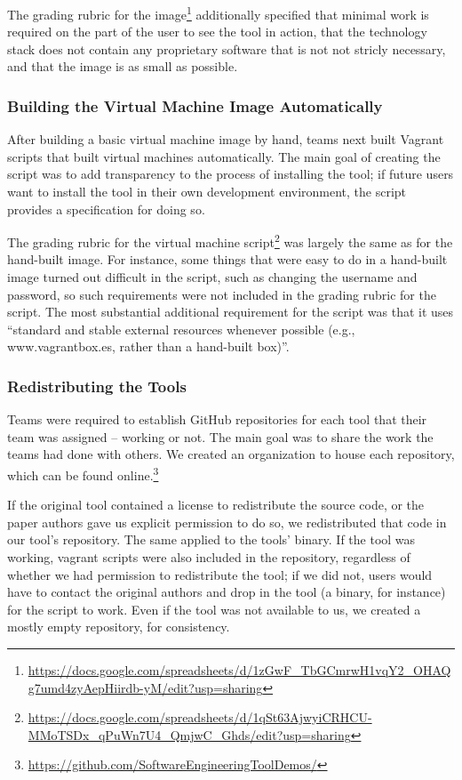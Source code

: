 \documentclass{sig-alternate-05-2015}
\begin{document}
The grading rubric for the image\footnote{\url{https://docs.google.com/spreadsheets/d/1zGwF_TbGCmrwH1vqY2_OHAQg7umd4zyAepHiirdb-yM/edit?usp=sharing}}
additionally specified that minimal work is required
on the part of the user to see the tool in action,
that the technology stack does not contain any proprietary 
software that is not not stricly necessary,
and that the image is as small as possible.


\subsubsection{Building the Virtual Machine Image Automatically}

After building a basic virtual machine image by hand,
teams next built Vagrant scripts that built virtual machines
automatically.
The main goal of creating the script was to add 
transparency to the process
of installing the tool; if future users want to install the tool
in their own development environment, the script provides a
specification for doing so.

The grading rubric for the virtual machine 
script\footnote{\url{https://docs.google.com/spreadsheets/d/1qSt63AjwyiCRHCU-MMoTSDx_qPuWn7U4_QmjwC_Ghds/edit?usp=sharing}}
was largely the same as for the hand-built image.
For instance, some things that were easy to do in a hand-built 
image turned out difficult in the script, such as changing 
the username and password, so such requirements were 
not included in the grading rubric for the script.
The most substantial additional requirement for the script
was that it uses ``standard and stable external resources 
whenever possible (e.g., www.vagrantbox.es, rather than a 
hand-built box)''.

\subsubsection{Redistributing the Tools}

Teams were required to establish GitHub repositories 
for each tool that their team was assigned -- working or not.
The main goal was to share the work the teams had 
done with others.
We created an organization to house each repository,
which can be found 
online.\footnote{\url{https://github.com/SoftwareEngineeringToolDemos/}}

If the original tool contained a license to redistribute
the source code, or the paper authors gave us explicit
permission to do so, we redistributed that code 
in our tool's repository.
The same applied to the tools' binary.
If the tool was working, 
vagrant scripts were also included in the repository,
regardless of whether we had permission to redistribute
the tool; if we did not, users would have to contact the 
original authors and drop in the tool (a binary, for instance)
for the script to work.
Even if the tool was not available to us, we created
a mostly empty repository, for consistency.
\end{document}
